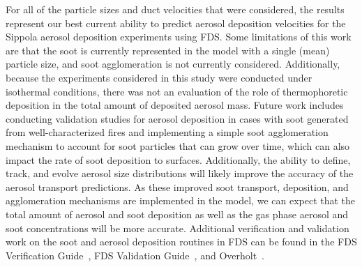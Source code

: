 For all of the particle sizes and duct velocities that were considered, the results represent our best current ability to predict aerosol deposition velocities for the Sippola aerosol deposition experiments using FDS. Some limitations of this work are that the soot is currently represented in the model with a single (mean) particle size, and soot agglomeration is not currently considered. Additionally, because the experiments considered in this study were conducted under isothermal conditions, there was not an evaluation of the role of thermophoretic deposition in the total amount of deposited aerosol mass. Future work includes conducting validation studies for aerosol deposition in cases with soot generated from well-characterized fires and implementing a simple soot agglomeration mechanism to account for soot particles that can grow over time, which can also impact the rate of soot deposition to surfaces. Additionally, the ability to define, track, and evolve aerosol size distributions will likely improve the accuracy of the aerosol transport predictions. As these improved soot transport, deposition, and agglomeration mechanisms are implemented in the model, we can expect that the total amount of aerosol and soot deposition as well as the gas phase aerosol and soot concentrations will be more accurate. Additional verification and validation work on the soot and aerosol deposition routines in FDS can be found in the FDS Verification Guide~\cite{FDS_Verification_Guide}, FDS Validation Guide~\cite{FDS_Validation_Guide}, and Overholt~\cite{Overholt:Dissertation}.

\clearpage



